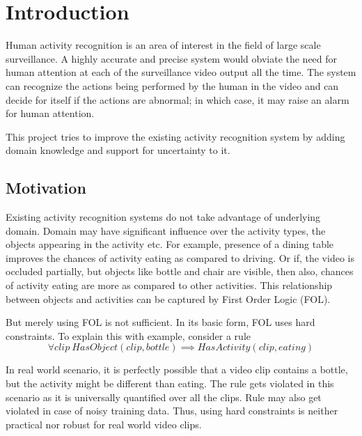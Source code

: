 \chapter{Introduction}

\label{ch1_INTRO}






Human activity recognition is an area of interest in the field of large scale surveillance.
A highly accurate and precise system would obviate the need for human attention
at each of the surveillance video output all the time. The system can recognize the
actions being performed by the human in the video and can decide for itself if the actions are abnormal;
in which case, it may raise an alarm for human attention.

This project tries to improve the existing activity recognition system
by adding domain knowledge and support for uncertainty to it.


\section{Motivation}
Existing activity recognition systems \cite{actionsInContext,Realistic,improving}  do not take advantage of underlying domain.
Domain may have significant influence over the activity types, the objects appearing
in the activity etc. For example, presence of a dining table improves the chances
of activity eating as compared to driving. Or if, the video is occluded partially,
but objects like bottle and chair are visible, then also, chances of activity eating
are more as compared to other activities. This relationship between objects and activities
can be captured by First Order Logic (FOL).

But merely using FOL is not sufficient. In its basic form, FOL uses hard constraints.
To explain this with example, consider a rule
\begin{equation}
	\label{MLNRule}
	\forall clip ~ HasObject( clip, bottle ) \implies HasActivity( clip, eating )
\end{equation}

In real world scenario, it is perfectly possible that a video clip contains a bottle,
but the activity might be different than eating. 
The rule gets violated in this scenario as it is universally quantified over all the clips. 
Rule may also get violated in case of noisy training data. 
Thus, using hard constraints is neither practical nor robust for real world video clips. 

